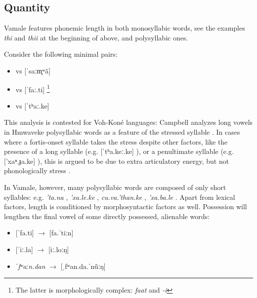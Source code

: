 	\subsection{Quantity}
	\label{sec:VQuantity}
	Vamale features phonemic length in both monosyllabic words, see the examples \textit{thi}  and \textit{thii}  at the beginning of  above, and polysyllabic ones.   %
	
Consider the following minimal pairs:

\begin{itemize}
 \item\relax [ˈsa.m̥ʷã]  vs [ˈsaːm̥ʷã] 
 \item\relax [ˈfa.ti]  vs [ˈfaː.ti] \footnote{The latter is morphologically complex: \textit{faat}  and \textit{-i} }
 \item\relax [ˈtʰa.ke]  vs [ˈtʰaː.ke] 
\end{itemize}
 
This analysis is contested for Voh-Koné languages: Campbell analyzes long vowels in Hmwaveke polysyllabic words as a feature of the stressed syllable \parencite[56]{campbell_phenomenon_1987}. In cases where a fortis-onset syllable takes the stress despite other factors, like the presence of a long syllable (e.g. [ˈtʰa.keː.ke] ), or a penultimate syllable (e.g. ['xaⁿ.ɟa.ke] ), this is argued to be due to extra articulatory energy, but not phonologically stress \parencite[59]{campbell_phenomenon_1987}.

In Vamale, however, many polysyllabic words are composed of only short syllables: e.g. \textit{'ta.na} , \textit{'xa.le.ke} , \textit{cu.va.'than.ke} , \textit{'xa.ba.le} . Apart from lexical factors, length is conditioned by morphosyntactic factors as well. Possession
	will lengthen the final vowel of some directly possessed, alienable words:
	
	\begin{itemize}
		\item {[ˈfa.ti]}  $\rightarrow$ {[fa.ˈtiːn]} 
		\item {[ˈiː.la]}  $\rightarrow$ {[iː.loːŋ]} 
		\item \textit{ˈfʷaːn.dan}  $\rightarrow$ {[ˌfʷan.da.ˈnũːŋ]} 
	\end{itemize}
	

